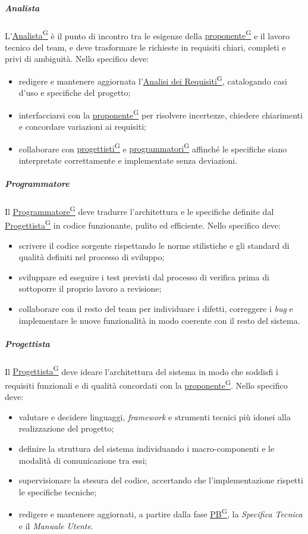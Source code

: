 \documentclass[a4paper,12pt]{article}
\providecommand{\glslink}[2]{\href{https://alittlebyte-19.github.io/Documentazione/glossario.html\#gls-#1}{\underline{#2}\textsuperscript{\scriptsize G}}}
\begin{document}
\subparagraph{Analista}
L'\glslink{analista}{Analista} è il punto di incontro tra le esigenze della \glslink{committente-proponente}{proponente} e il lavoro tecnico del team, e deve trasformare le richieste in requisiti chiari, completi e privi di ambiguità. Nello specifico deve:
\begin{itemize}
    \item redigere e mantenere aggiornata l'\glslink{analisi-dei-requisiti-adr}{Analisi dei Requisiti}, catalogando casi d'uso e specifiche del progetto;
    \item interfacciarsi con la \glslink{committente-proponente}{proponente} per risolvere incertezze, chiedere chiarimenti e concordare variazioni ai requisiti;
    \item collaborare con \glslink{progettista}{progettisti} e \glslink{programmatore}{programmatori} affinché le specifiche siano interpretate correttamente e implementate senza deviazioni.
\end{itemize}

\subparagraph{Programmatore}
Il \glslink{programmatore}{Programmatore} deve tradurre l'architettura e le specifiche definite dal \glslink{progettista}{Progettista} in codice funzionante, pulito ed efficiente. Nello specifico deve:
\begin{itemize}
    \item scrivere il codice sorgente rispettando le norme stilistiche e gli standard di qualità definiti nel processo di sviluppo;
    \item sviluppare ed eseguire i test previsti dal processo di verifica prima di sottoporre il proprio lavoro a revisione;
    \item collaborare con il resto del team per individuare i difetti, correggere i \textit{bug} e implementare le nuove funzionalità in modo coerente con il resto del sistema.
\end{itemize}

\subparagraph{Progettista}
Il \glslink{progettista}{Progettista} deve ideare l'architettura del sistema in modo che soddisfi i requisiti funzionali e di qualità concordati con la \glslink{committente-proponente}{proponente}. Nello specifico deve:
\begin{itemize}
    \item valutare e decidere linguaggi, \textit{framework} e strumenti tecnici più idonei alla realizzazione del progetto;
    \item definire la struttura del sistema individuando i macro-componenti e le modalità di comunicazione tra essi;
    \item supervisionare la stesura del codice, accertando che l'implementazione rispetti le specifiche tecniche;
    \item redigere e mantenere aggiornati, a partire dalla fase \glslink{pb-product-baseline}{PB}, la \textit{Specifica Tecnica} e il \textit{Manuale Utente}.
\end{itemize}
\end{document}
